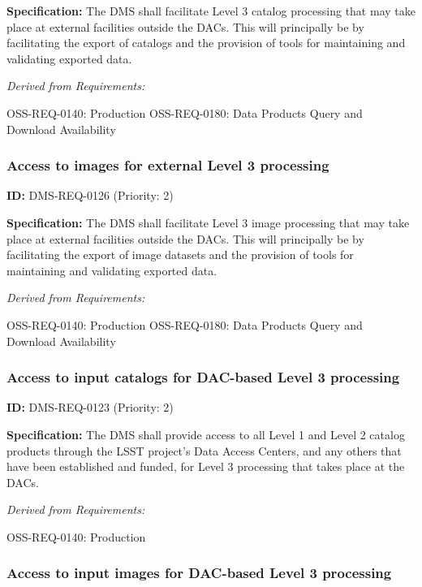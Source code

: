 \documentclass[SE,toc,lsstdraft]{lsstdoc}
\begin{document}
\textbf{Specification: }The DMS shall facilitate Level 3 catalog processing that may take place at external facilities outside the DACs.  This will principally be by facilitating the export of catalogs and the provision of tools for maintaining and validating exported data.

\emph{Derived from Requirements:}

OSS-REQ-0140:
Production \newline
OSS-REQ-0180:
Data Products Query and Download Availability \newline

\subsubsection{Access to images for external Level 3 processing}

\label{DMS-REQ-0126}
\textbf{ID:} DMS-REQ-0126 (Priority: 2)

\textbf{Specification: }The DMS shall facilitate Level 3 image processing that may take place at external facilities outside the DACs.  This will principally be by facilitating the export of image datasets and the provision of tools for maintaining and validating exported data.

\emph{Derived from Requirements:}

OSS-REQ-0140:
Production \newline
OSS-REQ-0180:
Data Products Query and Download Availability \newline

\subsubsection{Access to input catalogs for DAC-based Level 3 processing}

\label{DMS-REQ-0123}
\textbf{ID:} DMS-REQ-0123 (Priority: 2)

\textbf{Specification: }The DMS shall provide access to all Level 1 and Level 2 catalog products through the LSST project's Data Access Centers, and any others that have been established and funded, for Level 3 processing that takes place at the DACs.

\emph{Derived from Requirements:}

OSS-REQ-0140:
Production \newline

\subsubsection{Access to input images for DAC-based Level 3 processing}
\end{document}
